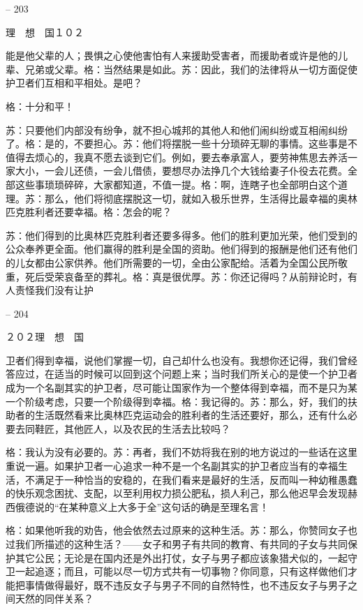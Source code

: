 \documentclass[11pt,oneside]{book}
\begin{document}
\begin{common-format}
    

-- 203

    理　想　国１０２

    能是他父辈的人；畏惧之心使他害怕有人来援助受害者，而援助者或许是他的儿辈、兄弟或父辈。格：当然结果是如此。苏：因此，我们的法律将从一切方面促使护卫者们互相和平相处。是吧？

    格：十分和平！

    苏：只要他们内部没有纷争，就不担心城邦的其他人和他们闹纠纷或互相闹纠纷了。格：是的，不要担心。苏：他们将摆脱一些十分琐碎无聊的事情。这些事是不值得去烦心的，我真不愿去谈到它们。例如，要去奉承富人，要劳神焦思去养活一家大小，一会儿还债，一会儿借债，要想尽办法挣几个大钱给妻子仆役去花费。全部这些事琐琐碎碎，大家都知道，不值一提。格：啊，连瞎子也全部明白这个道理。苏：那么，他们将彻底摆脱这一切，就如入极乐世界，生活得比最幸福的奥林匹克胜利者还要幸福。格：怎会的呢？

    苏：他们得到的比奥林匹克胜利者还要多得多。他们的胜利更加光荣，他们受到的公众奉养更全面。他们赢得的胜利是全国的资助。他们得到的报酬是他们还有他们的儿女都由公家供养。他们所需要的一切，全由公家配给。活着为全国公民所敬重，死后受荣哀备至的葬礼。格：真是很优厚。苏：你还记得吗？从前辩论时，有人责怪我们没有让护

    

-- 204

    ２０２理　想　国

    卫者们得到幸福，说他们掌握一切，自己却什么也没有。我想你还记得，我们曾经答应过，在适当的时候可以回到这个问题上来；当时我们所关心的是使一个护卫者成为一个名副其实的护卫者，尽可能让国家作为一个整体得到幸福，而不是只为某一个阶级考虑，只要一个阶级得到幸福。格：我记得的。苏：那么，好，我们的扶助者的生活既然看来比奥林匹克运动会的胜利者的生活还要好，那么，还有什么必要去同鞋匠，其他匠人，以及农民的生活去比较吗？

    格：我认为没有必要的。苏：再者，我们不妨将我在别的地方说过的一些话在这里重说一遍。如果护卫者一心追求一种不是一个名副其实的护卫者应当有的幸福生活，不满足于一种恰当的安稳的，在我们看来是最好的生活，反而叫一种幼稚愚蠢的快乐观念困扰、支配，以至利用权力损公肥私，损人利己，那么他迟早会发现赫西俄德说的“在某种意义上大多于全”这句话的确是至理名言！

    格：如果他听我的劝告，他会依然去过原来的这种生活。苏：那么，你赞同女子也过我们所描述的这种生活？——女子和男子有共同的教育、有共同的子女与共同保护其它公民；无论是在国内还是外出打仗，女子与男子都应该象猎犬似的，一起守卫一起追逐；而且，可能以尽一切方式共有一切事物？你同意，只有这样做他们才能把事情做得最好，既不违反女子与男子不同的自然特性，也不违反女子与男子之间天然的同伴关系？


\end{common-format}
\end{document}
